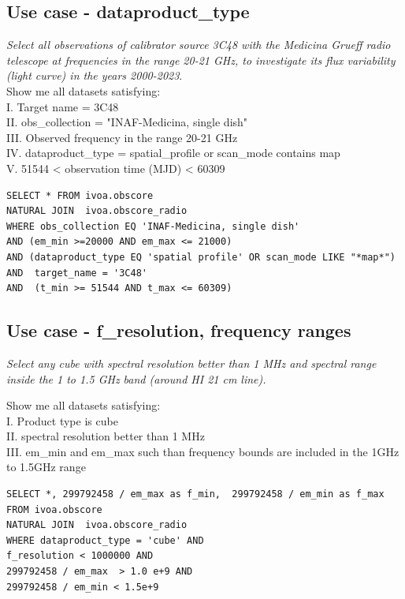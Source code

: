 \subsection{Use case - dataproduct\_type}
\textit{Select all observations of calibrator source 3C48 with the Medicina Grueff radio telescope at frequencies in the range 20-21 GHz, to investigate its flux variability (light curve) in the years 2000-2023}.\\
Show me all datasets satisfying: \\
I. Target name = 3C48 \\
II. obs\_collection = "INAF-Medicina, single dish"\\
III. Observed frequency in the range 20-21 GHz \\
IV. dataproduct\_type = spatial\_profile or scan\_mode contains map\\
V. 51544 < observation time (MJD) < 60309 
\begin{verbatim}
SELECT * FROM ivoa.obscore
NATURAL JOIN  ivoa.obscore_radio
WHERE obs_collection EQ 'INAF-Medicina, single dish' 
AND (em_min >=20000 AND em_max <= 21000) 
AND (dataproduct_type EQ 'spatial profile' OR scan_mode LIKE "*map*") 
AND  target_name = '3C48' 
AND  (t_min >= 51544 AND t_max <= 60309)
\end{verbatim}

\subsection{Use case - f\_resolution, frequency ranges}
\label{sec:FreqRanges}

\textit{Select any cube with spectral resolution better than 1 MHz and spectral range inside the 1 to 1.5 GHz band (around HI 21 cm line).}

Show me all datasets satisfying:\\
I. Product type is cube \\
II. spectral resolution better than 1 MHz \\
III. em\_min and em\_max such than frequency bounds are included in the 1GHz to 1.5GHz range \\
\begin{verbatim}
SELECT *, 299792458 / em_max as f_min,  299792458 / em_min as f_max 
FROM ivoa.obscore 
NATURAL JOIN  ivoa.obscore_radio
WHERE dataproduct_type = 'cube' AND
f_resolution < 1000000 AND
299792458 / em_max  > 1.0 e+9 AND
299792458 / em_min < 1.5e+9
\end{verbatim}

